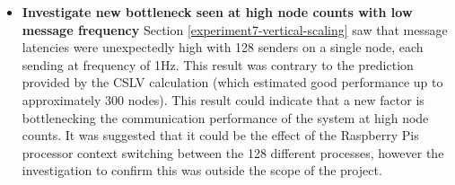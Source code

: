 \documentclass[../dissertation.tex]{subfiles}
\begin{document}
\begin{itemize}
  \item \textbf{Investigate new bottleneck seen at high node counts with low message frequency} Section \ref{experiment7-vertical-scaling} saw that message latencies were unexpectedly high with 128 senders on a single node, each sending at frequency of 1Hz. This result was contrary to the prediction provided by the CSLV calculation (which estimated good performance up to approximately 300 nodes). This result could indicate that a new factor is bottlenecking the communication performance of the system at high node counts. It was suggested that it could be the effect of the Raspberry Pis processor context switching between the 128 different processes, however the investigation to confirm this was outside the scope of the project.

\end{itemize}

\end{document}
